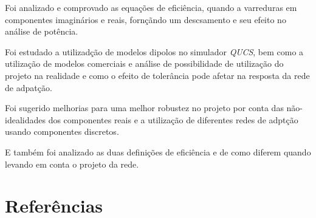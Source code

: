 \documentclass[a4paper,12pt]{proc}
\begin{document}
\singlespacing

\noindent Foi analizado e comprovado as equações de eficiência, quando a varreduras em componentes imaginários e reais, fornçãndo um descsamento e seu efeito no análise de potência. 

\singlespacing

\noindent Foi estudado a utilizadção de modelos dipolos no simulador \textit{QUCS}, bem como a utilização de modelos comerciais e análise de possibilidade de utilização do projeto na realidade e como o efeito de tolerância pode afetar na resposta da rede de adpatção. 

\singlespacing

\noindent Foi sugerido melhorias para uma melhor robustez no projeto por conta das não-idealidades dos componentes reais e a utilização de diferentes redes de adptção usando componentes discretos. 

\singlespacing

\noindent E também foi analizado as duas definições de eficiência e de como diferem quando levando em conta o projeto da rede.

\section{Referências}

\nocite{*}



\end{document}
